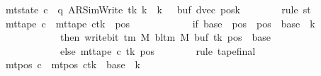 \begin{isabellebody}
\ {\isachardoublequoteopen}mt{\isacharunderscore}{\kern0pt}state\ c{}\ {\isacharequal}{\kern0pt}\ {\isacharparenleft}{\kern0pt}q{\isacharcomma}{\kern0pt}\ AR{\isacharunderscore}{\kern0pt}SimWrite{\isacharcomma}{\kern0pt}\ tk{\isacharcomma}{\kern0pt}\ {\isacharquery}{\kern0pt}k\ {\isacharplus}{\kern0pt}\ {\isacharparenleft}{\kern0pt}{\isacharquery}{\kern0pt}k\ {\isacharminus}{\kern0pt}\ {}{\isacharparenright}{\kern0pt}{\isacharcomma}{\kern0pt}\ buf{\isacharcomma}{\kern0pt}\ dvec{\isacharcomma}{\kern0pt}\ posk{\isacharparenright}{\kern0pt}{\isachardoublequoteclose}\isanewline
\ \ \ \ \ \ \isamarkupfalse%
\ {\isacharparenleft}{\kern0pt}rule\ st{}{\isacharparenright}{\kern0pt}\isanewline
\ \ \ \ \isamarkupfalse%
\ {\isachardoublequoteopen}mt{\isacharunderscore}{\kern0pt}tape\ c{}\ {\isacharequal}{\kern0pt}\ {\isacharparenleft}{\kern0pt}mt{\isacharunderscore}{\kern0pt}tape\ c{\isacharprime}{\kern0pt}{\isacharparenright}{\kern0pt}{\isacharparenleft}{\kern0pt}tk\ {\isacharcolon}{\kern0pt}{\isacharequal}{\kern0pt}\ {\isacharparenleft}{\kern0pt}{\isasymlambda}pos{\isachardot}{\kern0pt}\isanewline
\ \ \ \ \ \ \ \ \ \ \ \ if\ base\ {\isasymle}\ pos\ {\isasymand}\ pos\ {\isacharless}{\kern0pt}\ base\ {\isacharplus}{\kern0pt}\ {\isacharparenleft}{\kern0pt}{\isacharquery}{\kern0pt}k\ {\isacharminus}{\kern0pt}\ {}{\isacharparenright}{\kern0pt}\isanewline
\ \ \ \ \ \ \ \ \ \ \ \ then\ write{\isacharunderscore}{\kern0pt}bit\ {\isacharparenleft}{\kern0pt}{\isasymGamma}{\isacharunderscore}{\kern0pt}tm\ M{\isacharparenright}{\kern0pt}\ {\isacharparenleft}{\kern0pt}bl{\isacharunderscore}{\kern0pt}tm\ M{\isacharparenright}{\kern0pt}\ {\isacharparenleft}{\kern0pt}buf\ tk{\isacharparenright}{\kern0pt}\ {\isacharparenleft}{\kern0pt}pos\ {\isacharminus}{\kern0pt}\ base{\isacharparenright}{\kern0pt}\isanewline
\ \ \ \ \ \ \ \ \ \ \ \ else\ mt{\isacharunderscore}{\kern0pt}tape\ c{\isacharprime}{\kern0pt}\ tk\ pos{\isacharparenright}{\kern0pt}{\isacharparenright}{\kern0pt}{\isachardoublequoteclose}\isanewline
\ \ \ \ \ \ \isamarkupfalse%
\ {\isacharparenleft}{\kern0pt}rule\ tape{\isacharunderscore}{\kern0pt}final{\isacharparenright}{\kern0pt}\isanewline
\ \ \ \ \isamarkupfalse%
\ {\isachardoublequoteopen}mt{\isacharunderscore}{\kern0pt}pos\ c{}\ {\isacharequal}{\kern0pt}\ {\isacharparenleft}{\kern0pt}mt{\isacharunderscore}{\kern0pt}pos\ c{\isacharprime}{\kern0pt}{\isacharparenright}{\kern0pt}{\isacharparenleft}{\kern0pt}tk\ {\isacharcolon}{\kern0pt}{\isacharequal}{\kern0pt}\ base\ {\isacharplus}{\kern0pt}\ {\isacharparenleft}{\kern0pt}{\isacharquery}{\kern0pt}k\ {\isacharminus}{\kern0pt}\ {}{\isacharparenright}{\kern0pt}{\isacharparenright}{\kern0pt}{\isachardoublequoteclose}\ \isamarkupfalse%

\end{isabellebody}
